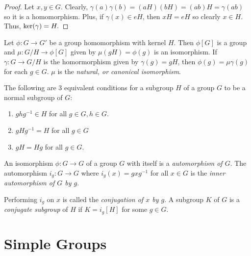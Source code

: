 \begin{proof}
    Let $x,y \in G$. Clearly, $\gamma(a)\gamma(b)=(aH)(bH)=(ab)H=\gamma(ab)$ so it is a homomorphism. Plus, if $\gamma(x) \in eH$, then $xH = eH$ so clearly $x \in H$. Thus, $\operatorname{ker}(\gamma) = H.$ 
\end{proof}
\begin{theorem}
    Let $\phi\colon G\to G'$ be a group homomorphism with kernel $H$. Then $\phi[G]$ is a group and $\mu\colon G/H\to \phi[G]$ given by $\mu(gH) = \phi(g)$ is an isomorphism. If $\gamma\colon G\to G/H$ is the homormorphism given by $\gamma(g) = gH$, then $\phi(g) = \mu\gamma(g)$ for each $g \in G$. $\mu$ is the \emph{natural, or canonical isomorphism}.
\end{theorem}
\begin{theorem}
    The following are 3 equivalent conditions for a subgroup $H$ of a group $G$ to be a normal subgroup of $G$:
    \begin{enumerate}
        \item $ghg^{-1} \in H$ for all $g \in G, h \in G$.
        \item $gHg^{-1} = H$ for all $g \in G$
        \item $gH = Hg$ for all $g \in G$.
    \end{enumerate}
\end{theorem}
\begin{definition}
    An isomorphism $\phi\colon G\to G$ of a group $G$ with itself is a \emph{automorphism of $G$}. The automorphism $i_g\colon G\to G$ where $i_g(x) = gxg^{-1}$ for all $x \in G$ is the \emph{inner automorphism of $G$ by $g$}.
\end{definition}
\begin{definition}
    Performing $i_g$ on $x$ is called the \emph{conjugation of $x$ by $g$}. A subgroup $K$ of $G$ is a \emph{conjugate subgroup} of $H$ if $K = i_g[H]$ for some $g \in G$.
\end{definition}

\section{Simple Groups}

